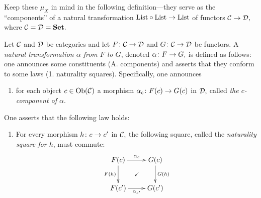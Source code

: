 \documentclass[CT4S-EN-RU]{subfiles}
\begin{document}
\begin{blockENG}
Keep these $\mu_X$ in mind in the following definition—they serve as the “components” of a natural transformation $\textnormal{List}\circ\textnormal{List}\rightarrow\textnormal{List}$ of functors $\mathcal{C}\rightarrow\mathcal{D},$ where $\mathcal{C}=\mathcal{D}={\mathbf{Set}}.$
\end{blockENG}

\begin{blockRUS}
\end{blockRUS}

\begin{definitionENG}\label{def:natural transformation}
Let $\mathcal{C}$ and $\mathcal{D}$ be categories and let $F\colon\mathcal{C}\rightarrow\mathcal{D}$ and $G\colon\mathcal{C}\rightarrow\mathcal{D}$ be functors. A {\em natural transformation $\alpha$ from $F$ to $G$}, denoted $\alpha\colon F\rightarrow G,$ is defined as follows: one announces some constituents (A. components) and asserts that they conform to some laws (1. naturality squares). Specifically, one announces
\begin{enumerate}[\hsp A.]
\item for each object $c\in\textnormal{Ob}(\mathcal{C})$ a morphism $\alpha_c\colon F(c)\rightarrow G(c)$ in $\mathcal{D},$ called {\em the $c$-component of $\alpha$}.
\end{enumerate}
One asserts that the following law holds:
\begin{enumerate}[\hsp 1.]
\item For every morphism $h\colon c\rightarrow c'$ in $\mathcal{C},$ the following square, called the {\em naturality square for $h$}, must commute:
\begin{align}\label{dia:naturality square}
\xymatrix{F(c)\ar@{}[dr]|{\checkmark}\ar[d]_{F(h)}\ar[r]^{\alpha_c}&G(c)\ar[d]^{G(h)}\\F(c')\ar[r]_{\alpha_{c'}}&G(c')}
\end{align}
\end{enumerate}
\end{definitionENG}

\begin{definitionRUS}\label{def:natural transformation}
\end{definitionRUS}
\end{document}

